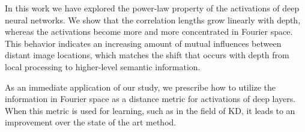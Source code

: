 \documentclass{article}
\begin{document}
In this work we have explored the power-law property of the activations of deep neural networks. We show that the correlation lengths grow linearly with depth, whereas the activations become more and more concentrated in Fourier space. This behavior indicates an increasing amount of mutual influences between distant image locations,  which matches the shift that occurs with depth from local processing to higher-level semantic information. 

As an immediate application of our study, we prescribe how to utilize the information in Fourier space as a distance metric for activations of deep layers.  When this metric is used for learning, such as in the field of KD,  it leads to an improvement over the state of the art method.

\newpage


\end{document}
